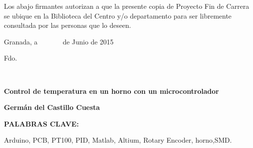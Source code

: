 \cleardoublepage
{}
\thispagestyle{empty}


\noindent Los abajo firmantes autorizan a que la presente copia de
Proyecto Fin de Carrera se ubique en la Biblioteca del Centro y/o
departamento para ser libremente consultada por las personas que lo
deseen.

\vspace*{1cm}

\begin{center}
Granada, a ~~~~~~ de Junio de 2015
\par\end{center}

\bigskip%
\bigskip%
\begin{doublespace}
\hspace{4cm}Fdo.
\end{doublespace}

\newpage
\thispagestyle{empty}

~

\cleardoublepage
{}
\thispagestyle{empty}

\begin{center}
\textbf{\Large Control de temperatura en un horno con un microcontrolador}
\par\end{center}{\Large \par}

\begin{center}
\textbf{\large Germán del Castillo Cuesta}
\par\end{center}{\large \par}

\vspace{0.75cm}






\begin{doublespace}
\noindent \textbf{PALABRAS CLAVE:}
\end{doublespace}



\begin{singlespace}
\noindent Arduino, PCB, PT100, PID, Matlab, Altium, Rotary Encoder, horno,SMD.

\end{singlespace}

